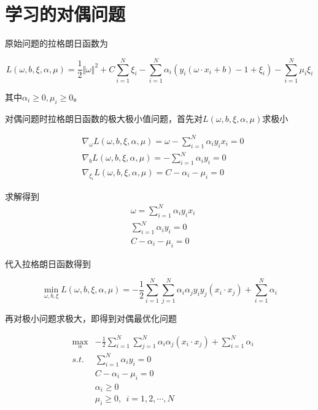 \section{学习的对偶问题}

原始问题的拉格朗日函数为

\begin{equation}
    L(\omega,b,\xi,\alpha,\mu)=\frac{1}{2}\Vert\omega\Vert^2+C\sum\limits_{i=1}^{N}\xi_i
    -\sum\limits_{i=1}^{N}\alpha_i(y_i(\omega\cdot x_i+b)-1+\xi_i)-\sum\limits_{i=1}^{N}
    \mu_i\xi_i
\end{equation}

其中$\alpha_i\geqslant 0,\mu_i\geqslant 0$。

对偶问题时拉格朗日函数的极大极小值问题，首先对$L(\omega,b,\xi,\alpha,\mu)$求极小

\begin{eqnarray}
    & \nabla_\omega L(\omega,b,\xi,\alpha,\mu)=\omega-\sum\limits_{i=1}^{N}\alpha_iy_ix_i=0\\
    & \nabla_b L(\omega,b,\xi,\alpha,\mu) = -\sum\limits_{i=1}^{N} \alpha_iy_i=0\\
    & \nabla_{\xi_i} L(\omega,b,\xi,\alpha,\mu)=C-\alpha_i-\mu_i=0
 \end{eqnarray}

 求解得到
 \begin{eqnarray}
    & \omega=\sum\limits_{i=1}^{N} \alpha_iy_ix_i\\
    & \sum\limits_{i=1}^{N}\alpha_iy_i=0\\
    & C-\alpha_i-\mu_i=0
 \end{eqnarray}

 代入拉格朗日函数得到

 \begin{equation}
    \min\limits_{\omega,b,\xi} L(\omega,b,\xi,\alpha,\mu)=-\frac{1}{2}\sum\limits_{i=1}^{N}
    \sum\limits_{j=1}^{N}\alpha_i\alpha_jy_iy_j(x_i\cdot x_j)+\sum\limits_{i=1}^{N}\alpha_i
\end{equation}

再对极小问题求极大，即得到对偶最优化问题

\begin{eqnarray}
    & \max\limits_{\alpha} &-\frac{1}{2}\sum\limits_{i=1}^{N}\sum\limits_{j=1}^{N}\alpha_i\alpha_j(x_i\cdot x_j)+\sum\limits_{i=1}^{N}\alpha_i\\
    & s.t. & \sum\limits_{i=1}^{N}\alpha_iy_i=0\\
    & & C-\alpha_i-\mu_i=0 \label{eq:7.46}\\
    & & \alpha_i\geqslant 0\\
    & & \mu_i\geqslant 0,\ \ i=1,2,\cdots,N
\end{eqnarray}

